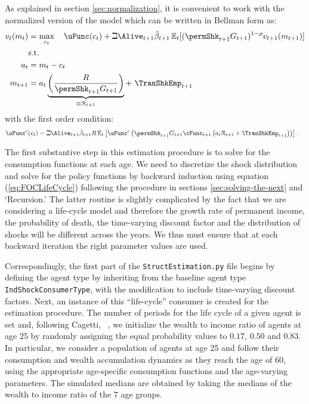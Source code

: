 \documentclass[titlepage, headings=optiontotocandhead]{Resources/texmf-local/tex/latex/econtex}
\begin{document}
As explained in section \ref{sec:normalization}, it is convenient to work with the normalized version of the model which can be written in Bellman form as:
  \begin{equation*}\begin{gathered}\begin{aligned}
        v_{t}(m_{t})  & = \max_{{c}_{t}}~~~ \uFunc(c_{t})+\beth\Alive_{t+1}\hat{\beta}_{t+1}
        \Ex_{t}[(\permShk_{t+1}G_{t+1})^{1-\rho}v_{t+1}(m_{t+1})]   \\
        & \text{s.t.}   \nonumber \\
        a_{t}    & = m_{t}-c_{t} \nonumber
        \\      m_{t+1}  & = a_{t}\underbrace{\left(\frac{R}{\permShk_{t+1}G_{t+1}}\right)}_{\equiv \mathcal{R}_{t+1}}+ ~\TranShkEmp_{t+1}
      \end{aligned}\end{gathered}\end{equation*}
with the first order condition:
  \begin{equation}\begin{gathered}\begin{aligned}
        \uFunc^{c}(c_{t}) & = \beth\Alive_{t+1}\hat{\beta}_{t+1}R \Ex_{t}\left[\uFunc^{c}\left(\permShk_{t+1}G_{t+1}\cFunc_{t+1}\left(a_{t}\mathcal{R}_{t+1}+\TranShkEmp_{t+1}\right)\right)\right]\label{eq:FOCLifeCycle}
        .
      \end{aligned}\end{gathered}\end{equation}

The first substantive {step} in this estimation procedure is
to solve for the consumption functions at each age. We need to
discretize the shock distribution and solve for the policy
functions by backward induction using equation (\ref{eq:FOCLifeCycle})
following the procedure in sections \ref{sec:solving-the-next} and
`Recursion.' The latter routine
is slightly complicated by the fact that we are considering a
life-cycle model and therefore the growth rate of permanent income,
the probability of death, the time-varying discount factor and the
distribution of shocks will be different across the years. We thus
must ensure that at each backward iteration the right parameter
values are used.

Correspondingly, the first part of the \texttt{StructEstimation.py} file begins by defining the agent type by inheriting from the baseline agent type \texttt{IndShockConsumerType}, with the modification to include time-varying discount factors. Next, an instance of this ``life-cycle'' consumer is created for the estimation procedure.  The number of periods for the life cycle of a given agent is set and, following Cagetti, ~\citeyearpar{cagettiWprofiles}, we initialize the wealth to income ratio of agents at age $25$ by randomly assigning the equal probability values to $0.17$, $0.50$ and $0.83$. In particular, we consider a population of agents at age 25 and follow their consumption and wealth accumulation dynamics as they reach the age of $60$, using the appropriate age-specific consumption functions and the age-varying parameters. The simulated medians are obtained by taking the medians of the wealth to income ratio of the $7$ age groups.
\end{document}
